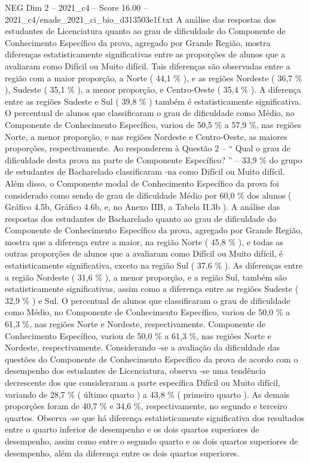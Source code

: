\begin{textsample}{NEG Dim 2 – 2021\_c4 – Score 16.00 – 2021\_c4/enade\_2021\_ci\_bio\_d313503e1f.txt}
A análise das respostas dos estudantes de Licenciatura quanto ao grau de dificuldade do Componente de Conhecimento Específico da prova, agregado por Grande Região, mostra diferenças estatisticamente significativas entre as proporções de alunos que a avaliaram como Difícil ou Muito difícil.
Tais diferenças são observadas entre a região com a maior proporção, a Norte ( 44,1 \% ), e as regiões Nordeste ( 36,7 \% ), Sudeste ( 35,1 \% ), a menor proporção, e Centro-Oeste ( 35,4 \% ).
A diferença entre as regiões Sudeste e Sul ( 39,8 \% ) também é estatisticamente significativa.
O percentual de alunos que classificaram o grau de dificuldade como Médio, no Componente de Conhecimento Específico, variou de 50,5 \% a 57,9 \%, nas regiões Norte, a menor proporção, e nas regiões Nordeste e Centro-Oeste, as maiores proporções, respectivamente.
Ao responderem à Questão 2 – “ Qual o grau de dificuldade desta prova na parte de Componente Específico? ” – 33,9 \% do grupo de estudantes de Bacharelado classificaram -na como Difícil ou Muito difícil.
Além disso, o Componente modal de Conhecimento Específico da prova foi considerado como sendo de grau de dificuldade Médio por 60,0 \% dos alunos ( Gráfico 4.5b, Gráfico 4.6b, e, no Anexo IIB, a Tabela II.3b ).
A análise das respostas dos estudantes de Bacharelado quanto ao grau de dificuldade do Componente de Conhecimento Específico da prova, agregado por Grande Região, mostra que a diferença entre a maior, na região Norte ( 45,8 \% ), e todas as outras proporções de alunos que a avaliaram como Difícil ou Muito difícil, é estatisticamente significativa, exceto na região Sul ( 37,6 \% ).
As diferenças entre a região Nordeste ( 31,6 \% ), a menor proporção, e a região Sul, também são estatisticamente significativas, assim como a diferença entre as regiões Sudeste ( 32,9 \% ) e Sul.
O percentual de alunos que classificaram o grau de dificuldade como Médio, no Componente de Conhecimento Específico, variou de 50,0 \% a 61,3 \%, nas regiões Norte e Nordeste, respectivamente.
Componente de Conhecimento Específico, variou de 50,0 \% a 61,3 \%, nas regiões Norte e Nordeste, respectivamente.
Considerando -se a avaliação da dificuldade das questões do Componente de Conhecimento Específico da prova de acordo com o desempenho dos estudantes de Licenciatura, observa -se uma tendência decrescente dos que consideraram a parte específica Difícil ou Muito difícil, variando de 28,7 \% ( último quarto ) a 43,8 \% ( primeiro quarto ).
As demais proporções foram de 40,7 \% e 34,6 \%, respectivamente, no segundo e terceiro quartos.
Observa -se que há diferença estatisticamente significativa dos resultados entre o quarto inferior de desempenho e os dois quartos superiores de desempenho, assim como entre o segundo quarto e os dois quartos superiores de desempenho, além da diferença entre os dois quartos superiores.

\end{textsample}
